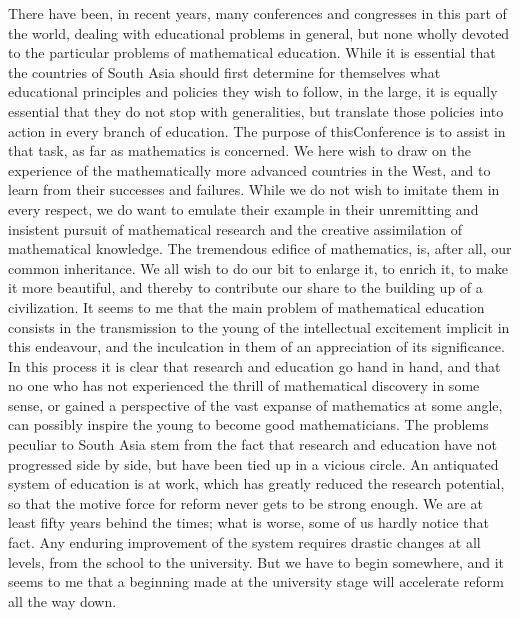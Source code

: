 There have been, in recent years, many conferences and congresses in this part of the world, dealing with educational problems in general, but none wholly devoted to the particular problems of mathematical education. While it is essential that the countries of South Asia should first determine for themselves what educational principles and policies they wish to follow, in the large, it is equally essential that they do not stop with generalities, but translate those policies into action in every branch of education. The purpose of this\pageoriginale Conference is to assist in that task, as far as mathematics is concerned. We here wish to draw on the experience of the mathematically more advanced countries in the West, and to learn from their successes and failures. While we do not wish to imitate them in every respect, we do want to emulate their example in their unremitting and insistent pursuit of mathematical research and the creative assimilation of mathematical knowledge. The tremendous edifice of mathematics, is, after all, our common inheritance. We all wish to do our bit to enlarge it, to enrich it, to make it more beautiful, and thereby to contribute our share to the building up of a civilization. It seems to me that the main problem of mathematical education consists in the transmission to the young of the intellectual excitement implicit in this endeavour, and the inculcation in them of an appreciation of its significance. In this process it is clear that research and education go hand in hand, and that no one who has not experienced the thrill of mathematical discovery in some sense, or gained a perspective of the vast expanse of mathematics at some angle, can possibly inspire the young to become good mathematicians. The problems peculiar to South Asia stem from the fact that research and education have not progressed side by side, but have been tied up in a vicious circle. An antiquated system of education is at work, which has greatly reduced the research potential, so that the motive force for reform never gets to be strong enough. We are at least fifty years behind the times; what is worse, some of us hardly notice that fact. Any enduring improvement of the system requires drastic changes at all levels, from the school to the university. But we have to begin somewhere, and it seems to me that a beginning made at the university stage will accelerate reform all the way down.

